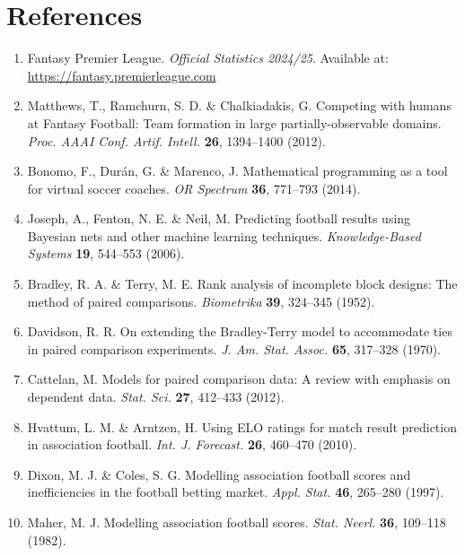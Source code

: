\documentclass[10pt,a4paper,twocolumn]{article}
\begin{document}
\section*{References}

\small
\begin{enumerate}
\item Fantasy Premier League. \textit{Official Statistics 2024/25}. Available at: \url{https://fantasy.premierleague.com}

\item Matthews, T., Ramchurn, S. D. \& Chalkiadakis, G. Competing with humans at Fantasy Football: Team formation in large partially-observable domains. \textit{Proc. AAAI Conf. Artif. Intell.} \textbf{26}, 1394–1400 (2012).

\item Bonomo, F., Durán, G. \& Marenco, J. Mathematical programming as a tool for virtual soccer coaches. \textit{OR Spectrum} \textbf{36}, 771–793 (2014).

\item Joseph, A., Fenton, N. E. \& Neil, M. Predicting football results using Bayesian nets and other machine learning techniques. \textit{Knowledge-Based Systems} \textbf{19}, 544–553 (2006).

\item Bradley, R. A. \& Terry, M. E. Rank analysis of incomplete block designs: The method of paired comparisons. \textit{Biometrika} \textbf{39}, 324–345 (1952).

\item Davidson, R. R. On extending the Bradley-Terry model to accommodate ties in paired comparison experiments. \textit{J. Am. Stat. Assoc.} \textbf{65}, 317–328 (1970).

\item Cattelan, M. Models for paired comparison data: A review with emphasis on dependent data. \textit{Stat. Sci.} \textbf{27}, 412–433 (2012).

\item Hvattum, L. M. \& Arntzen, H. Using ELO ratings for match result prediction in association football. \textit{Int. J. Forecast.} \textbf{26}, 460–470 (2010).

\item Dixon, M. J. \& Coles, S. G. Modelling association football scores and inefficiencies in the football betting market. \textit{Appl. Stat.} \textbf{46}, 265–280 (1997).

\item Maher, M. J. Modelling association football scores. \textit{Stat. Neerl.} \textbf{36}, 109–118 (1982).
\end{enumerate}
\end{document}
